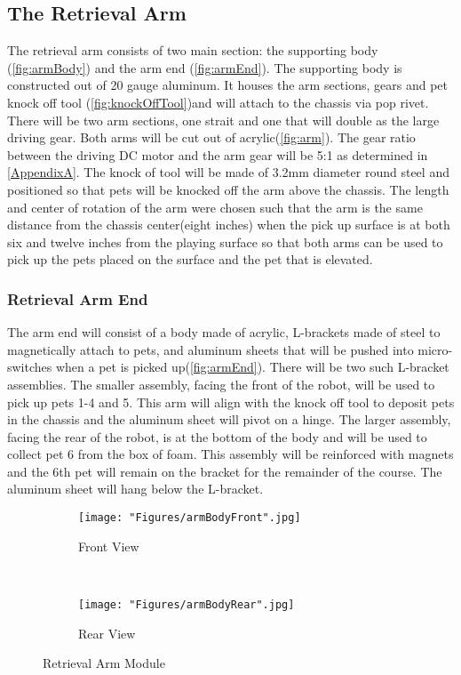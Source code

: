 \documentclass[11pt, oneside]{article} %
\begin{document}
	\newpage	
	\subsection{The Retrieval Arm}
	The retrieval arm consists of two main section: the supporting body (\autoref{fig:armBody}) and the arm end (\autoref{fig:armEnd}). The supporting body is constructed out of 20 gauge aluminum. It houses the arm sections, gears and pet knock off tool (\autoref{fig:knockOffTool})and will attach to the chassis via pop rivet. There will be two arm sections, one strait and one that will double as the large driving gear. Both arms will be cut out of acrylic(\autoref{fig:arm}). The gear ratio between the driving DC motor and the arm gear will be 5:1 as determined in \autoref{AppendixA}. The knock of tool will be made of 3.2mm diameter round steel and positioned so that pets will be knocked off the arm above the chassis. The length and center of rotation of the arm were chosen such that the arm is the same distance from the chassis center(eight inches) when the pick up surface is at both six and twelve inches from the playing surface so that both arms can be used to pick up the pets placed on the surface and the pet that is elevated.
	
		\subsubsection{Retrieval Arm End}
		The arm end will consist of a body made of acrylic, L-brackets made of steel to magnetically attach to pets, and aluminum sheets that will be pushed into micro-switches when a pet is picked up(\autoref{fig:armEnd}). There will be two such L-bracket assemblies. The smaller assembly, facing the front of the robot, will be used to pick up pets 1-4 and 5. This arm will align with the knock off tool to deposit pets in the chassis and the aluminum sheet will pivot on a hinge. The larger assembly, facing the rear of the robot, is at the bottom of the body and will be used to collect pet 6 from the box of foam. This assembly will be reinforced with magnets and the 6th pet will remain on the bracket for the remainder of the course. The aluminum sheet will hang below the L-bracket.
		
	\begin{figure}[h]
		\centering
		\begin{subfigure}[b]{0.4\textwidth}
			\centering
			\texttt{[image: "Figures/armBodyFront".jpg]}
			\caption{Front View}
		\end{subfigure}
		~
		\begin{subfigure}[b]{0.5\textwidth}
			\centering
			\texttt{[image: "Figures/armBodyRear".jpg]}
			\caption{Rear View}
		\end{subfigure}
		\caption[Retrieval Arm Module]{Retrieval Arm Module}
		\label{fig:armBody}
	\end{figure}
		
\end{document}
